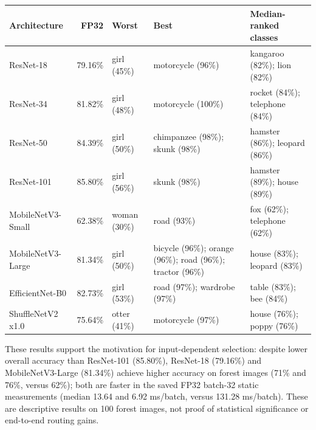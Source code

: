 \begin{tabular}{l r p{2.5cm} p{3.5cm} p{3cm}}
\hline
Architecture & FP32 & Worst & Best & Median-ranked classes \\
\hline
ResNet-18 & 79.16\% & girl (45\%) & motorcycle (96\%) & kangaroo (82\%); lion (82\%) \\
ResNet-34 & 81.82\% & girl (48\%) & motorcycle (100\%) & rocket (84\%); telephone (84\%) \\
ResNet-50 & 84.39\% & girl (50\%) & chimpanzee (98\%); skunk (98\%) & hamster (86\%); leopard (86\%) \\
ResNet-101 & 85.80\% & girl (56\%) & skunk (98\%) & hamster (89\%); house (89\%) \\
MobileNetV3-Small & 62.38\% & woman (30\%) & road (93\%) & fox (62\%); telephone (62\%) \\
MobileNetV3-Large & 81.34\% & girl (50\%) & bicycle (96\%); orange (96\%); road (96\%); tractor (96\%) & house (83\%); leopard (83\%) \\
EfficientNet-B0 & 82.73\% & girl (53\%) & road (97\%); wardrobe (97\%) & table (83\%); bee (84\%) \\
ShuffleNetV2 x1.0 & 75.64\% & otter (41\%) & motorcycle (97\%) & house (76\%); poppy (76\%) \\
\hline
\end{tabular}

\par\smallskip
These results support the motivation for input-dependent selection: despite lower overall accuracy than ResNet-101 (85.80\%), ResNet-18 (79.16\%) and MobileNetV3-Large (81.34\%) achieve higher accuracy on forest images (71\% and 76\%, versus 62\%); both are faster in the saved FP32 batch-32 static measurements (median 13.64 and 6.92 ms/batch, versus 131.28 ms/batch). These are descriptive results on 100 forest images, not proof of statistical significance or end-to-end routing gains.
